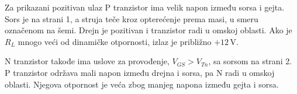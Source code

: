 Za prikazani pozitivan ulaz P tranzistor ima velik napon između sorsa i gejta. Sors je na strani 1, a struja teče kroz opterećenje prema masi, u smeru označenom na šemi. Drejn je pozitivan i tranzistor radi u omskoj oblasti. Ako je $R_L$ mnogo veći od dinamičke otpornosti, izlaz je približno $+12\,\mathrm V$.

N tranzistor takođe ima uslove za provođenje, $V_{GS}>V_{Tn}$, sa sorsom na strani 2. P tranzistor održava mali napon između drejna i sorsa, pa N radi u omskoj oblasti. Njegova otpornost je veća zbog manjeg napona između gejta i sorsa.
